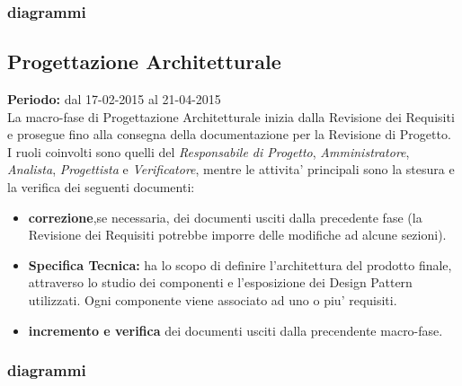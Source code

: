 \subsubsection{diagrammi}


\subsection{Progettazione Architetturale}
\textbf{Periodo:} dal 17-02-2015 al 21-04-2015 \\
La macro-fase di Progettazione Architetturale inizia dalla Revisione dei Requisiti e prosegue fino alla consegna della documentazione per la Revisione di Progetto. \\
I ruoli coinvolti sono quelli del \textit{Responsabile di Progetto}, \textit{Amministratore}, \textit{Analista}, \textit{Progettista} e \textit{Verificatore}, mentre le attivita' principali sono la stesura e la verifica dei seguenti documenti:

\begin{itemize}
\item \textbf{correzione},se necessaria, dei documenti usciti dalla precedente fase (la Revisione dei Requisiti potrebbe imporre delle modifiche ad alcune sezioni).
\item \textbf{Specifica Tecnica:} ha lo scopo di definire l'architettura del prodotto finale,  attraverso lo studio dei componenti e l'esposizione dei Design Pattern utilizzati. Ogni componente viene associato ad uno o piu' requisiti.
\item \textbf{incremento e verifica} dei documenti usciti dalla precendente macro-fase.
\end{itemize}

\subsubsection{diagrammi}



